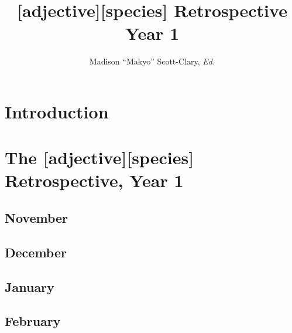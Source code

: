 \documentclass[12pt,letterpaper,oneside]{memoir}
\begin{document}
  \title{[adjective][species] Retrospective Year 1}
  \author{Madison ``Makyo'' Scott-Clary, \textit{Ed.}}
  \maketitle
  \newpage

  \tableofcontents

  \part{Introduction}
  

  \part{The [adjective][species] Retrospective, Year 1}

  \chapter{November}
  
  
  
  
  

  \chapter{December}
  
  
  
  

  \chapter{January}
  
  
  
  
  
  
  

  \chapter{February}
  
  
  
  
  
  
  
  
\end{document}
